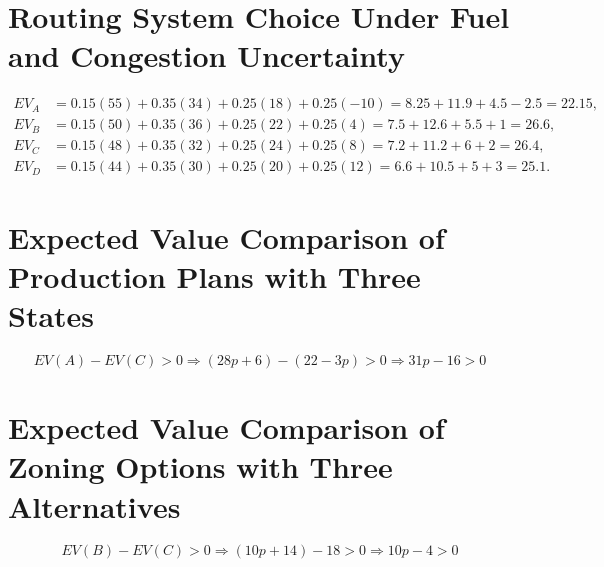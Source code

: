 \section*{Routing System Choice Under Fuel and Congestion Uncertainty}
\[\begin{aligned}
		EV_A &= 0.15(55)+0.35(34)+0.25(18)+0.25(-10)=8.25+11.9+4.5-2.5=22.15,\\
		EV_B &= 0.15(50)+0.35(36)+0.25(22)+0.25(4)=7.5+12.6+5.5+1=26.6,\\
		EV_C &= 0.15(48)+0.35(32)+0.25(24)+0.25(8)=7.2+11.2+6+2=26.4,\\
		EV_D &= 0.15(44)+0.35(30)+0.25(20)+0.25(12)=6.6+10.5+5+3=25.1.
		\end{aligned}\]

\section*{Expected Value Comparison of Production Plans with Three States}
\[EV(A)-EV(C)>0 \Rightarrow (28p+6)-(22-3p)>0 \Rightarrow 31p-16>0\]

\section*{Expected Value Comparison of Zoning Options with Three Alternatives}
\[EV(B)-EV(C)>0 \Rightarrow (10p+14)-18>0 \Rightarrow 10p-4>0\]


